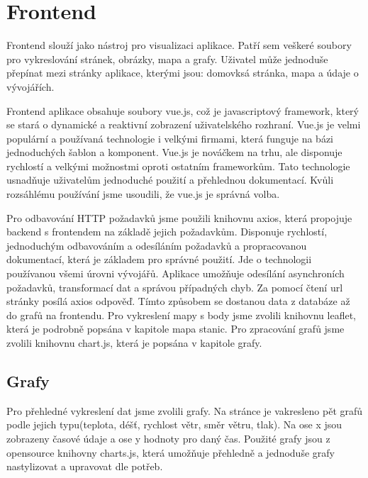 \section{Frontend} \label{frontend}
Frontend slouží jako nástroj pro visualizaci aplikace. Patří sem veškeré soubory pro vykreslování stránek, obrázky, mapa a grafy. Uživatel může jednoduše přepínat mezi stránky aplikace, kterými jsou: domovksá stránka, mapa a údaje o vývojářích.

Frontend aplikace obsahuje soubory vue.js, což je javascriptový framework, který se stará o dynamické a reaktivní zobrazení uživatelského rozhraní. Vue.js je velmi populární a používaná technologie i velkými firmami, která funguje na bázi jednoduchých šablon a komponent.
Vue.js je nováčkem na trhu, ale disponuje rychlostí a velkými možnostmi oproti ostatním frameworkům.
Tato technologie usnadňuje uživatelům jednoduché použití a přehlednou dokumentací. Kvůli rozsáhlému používání jsme usoudili, že vue.js je správná volba. 

Pro odbavování HTTP požadavků jsme použili knihovnu axios, která propojuje backend s frontendem na základě jejich požadavkům. Disponuje rychlostí, jednoduchým odbavováním a odesíláním požadavků a propracovanou dokumentací, která je základem pro správné použití.
Jde o technologii používanou všemi úrovni vývojářů. Aplikace umožňuje odesílání asynchroních požadavků, transformací dat a správou případných chyb.
Za pomocí čtení url stránky posílá axios odpověď. Tímto způsobem se dostanou data z databáze až do grafů na frontendu. 
Pro vykreslení mapy s body jsme zvolili knihovnu leaflet, která je podrobně popsána v kapitole mapa stanic. Pro zpracování grafů jsme zvolili knihovnu chart.js, která je popsána v kapitole grafy.

\subsection{Grafy}
Pro přehledné vykreslení dat jsme zvolili grafy. Na stránce je vakresleno pět grafů podle jejich typu(teplota, déšť, rychlost větr, směr větru, tlak). %
Na ose x jsou zobrazeny časové údaje a ose y hodnoty pro daný čas. Použité grafy jsou z opensource knihovny charts.js, která umožňuje přehledně a jednoduše grafy nastylizovat a upravovat dle potřeb.

